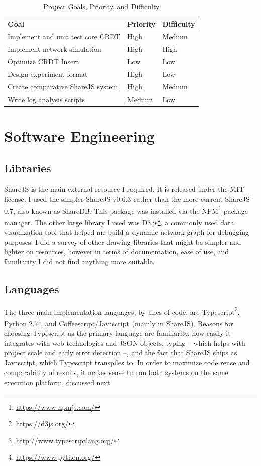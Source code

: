 \documentclass[12pt,a4paper,twoside,openright]{report}
\begin{document}
\begin{center}
\begin{table}[H]
\centering
\caption{Project Goals, Priority, and Difficulty}
\label{table: goals}
\begin{tabular}{@{}lll@{}}
Goal											 	& Priority & Difficulty \\ \toprule
Implement and unit test core CRDT                	& High     & Medium \\ \midrule
Implement network simulation                     	& High     & High   \\ \midrule
Optimize CRDT Insert                             	& Low      & Low    \\ \midrule
Design experiment format                         	& High     & Low    \\ \midrule
Create comparative ShareJS system					& High     & Medium \\ \midrule
Write log analysis scripts                       	& Medium   & Low    \\ \bottomrule
\end{tabular}
\end{table}
\end{center}



\section{Software Engineering}

	\subsection{Libraries}
	ShareJS \cite{sharejs} is the main external resource I required. It is released under the MIT license. I used the simpler ShareJS v0.6.3 rather than the more current ShareJS 0.7, also known as ShareDB. This package was installed via the NPM\footnote{\url{https://www.npmjs.com/}} package manager. The other large library I used was D3.js\footnote{\url{https://d3js.org/}}, a commonly used data visualization tool that helped me build a dynamic network graph for debugging purposes. I did a survey of other drawing libraries that might be simpler and lighter on resources, however in terms of documentation, ease of use, and familiarity I did not find anything more suitable.
	
	\subsection{Languages}
	The three main implementation languages, by lines of code, are Typescript\footnote{\url{http://www.typescriptlang.org/}}, Python 2.7\footnote{\url{https://www.python.org/}}, and Coffeescript/Javascript  (mainly in ShareJS). Reasons for choosing Typescript as the primary language are familiarity, how easily it integrates with web technologies and JSON objects, typing -- which helps with project scale and early error detection --, and the fact that ShareJS ships as Javascript, which Typescript transpiles to. In order to maximize code reuse and comparability of results, it makes sense to run both systems on the same execution platform, discussed next.
	
\end{document}
